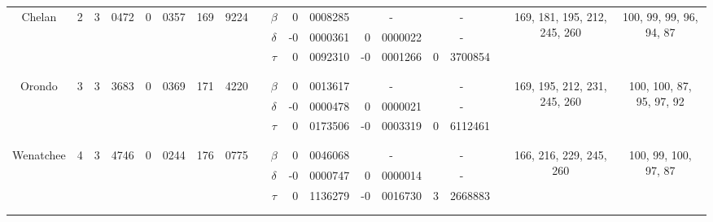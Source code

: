 \begin{tabular*}{290mm}{ccr@{.}lr@{.}lr@{.}lccr@{.}lr@{.}lr@{.}lccc}
		Chelan		& {2}		& 	3&0472 			& 0&0357 			&  169&9224		 & & {\bf{$\beta$}}  &  0&0008285				  &  \multicolumn{2}{c}{ - }			&  \multicolumn{2}{c}{ - }		& & \multirow{3}{*}{169, 181, 195, 212, 245, 260}	& \multirow{3}{*}{100, 99, 99, 96, 94, 87} \\
				& 		& 	\multicolumn{2}{c}{  }	& \multicolumn{2}{c}{  }	& \multicolumn{2}{c}{  } & & {\bf{$\delta$}} & -0&0000361				  &  0&0000022					&  \multicolumn{2}{c}{ - }		& &  							&  \\
				& 		& 	\multicolumn{2}{c}{  }	& \multicolumn{2}{c}{  }	& \multicolumn{2}{c}{  } & & {\bf{$\tau$}}   &  0&0092310				  & -0&0001266					&  0&3700854 				& & 							&  \\		
				\multicolumn{19}{c}{ } \\
				\cline{3-19}
				\multicolumn{19}{c}{ } \\
		Orondo		& {3}		& 	3&3683			& 0&0369 			&  171&4220		 & & {\bf{$\beta$}}  &  0&0013617				  &  \multicolumn{2}{c}{ - }			&  \multicolumn{2}{c}{ - }		& & \multirow{3}{*}{169, 195, 212, 231, 245, 260}	& \multirow{3}{*}{100, 100, 87, 95, 97, 92} \\
				& 		& 	\multicolumn{2}{c}{  }	& \multicolumn{2}{c}{  }	& \multicolumn{2}{c}{  } & & {\bf{$\delta$}} & -0&0000478				  &  0&0000021					&  \multicolumn{2}{c}{ - }		& &  							&  \\
				& 		& 	\multicolumn{2}{c}{  }	& \multicolumn{2}{c}{  }	& \multicolumn{2}{c}{  } & & {\bf{$\tau$}}   &  0&0173506				  & -0&0003319					&  0&6112461 				& & 							&  \\		
				\multicolumn{19}{c}{ } \\
				\cline{3-19}
				\multicolumn{19}{c}{ } \\
		Wenatchee	& {4}		& 	3&4746 			& 0&0244 			&  176&0775		 & & {\bf{$\beta$}}  &  0&0046068				  &  \multicolumn{2}{c}{ - }			&  \multicolumn{2}{c}{ - }		& & \multirow{3}{*}{166, 216, 229, 245, 260}	& \multirow{3}{*}{100, 99, 100, 97, 87} \\
				& 		& 	\multicolumn{2}{c}{  }	& \multicolumn{2}{c}{  }	& \multicolumn{2}{c}{  } & & {\bf{$\delta$}} & -0&0000747				  &  0&0000014					&  \multicolumn{2}{c}{ - }		& &  							&  \\
				& 		& 	\multicolumn{2}{c}{  }	& \multicolumn{2}{c}{  }	& \multicolumn{2}{c}{  } & & {\bf{$\tau$}}   &  0&1136279				  & -0&0016730					&  3&2668883 				& & 							&  \\		
				\multicolumn{19}{c}{ } \\
				\cline{3-19}
				\multicolumn{19}{c}{ } \\

\end{tabular*}
